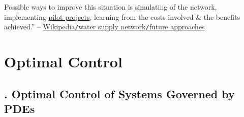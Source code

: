 \documentclass[oneside]{book}
\numberwithin{equation}{section}
\begin{document}
Possible ways to improve this situation is simulating of the network, implementing \href{https://en.wikipedia.org/wiki/Pilot_project}{pilot projects}, learning from the costs involved \& the benefits achieved.'' -- \href{https://en.wikipedia.org/wiki/Water_supply_network#Future_approaches}{Wikipedia\texttt{/}water supply network\texttt{/}future approaches}


\part{Optimal Control}

\chapter{\cite{Lions1971}. Optimal Control of Systems Governed by PDEs}
\end{document}
